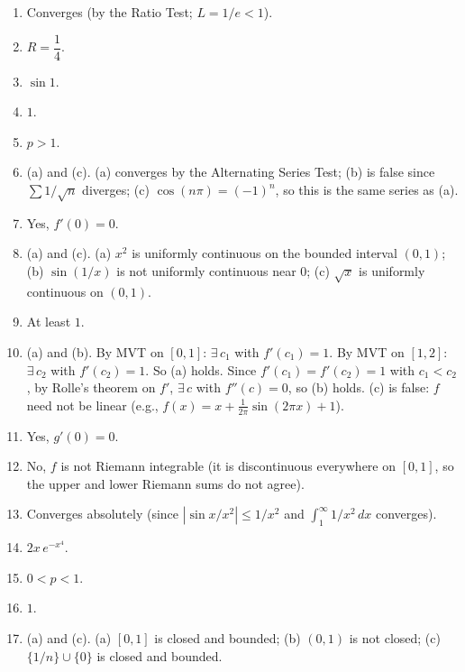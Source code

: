 \documentclass[11pt]{article}
\begin{document}
\begin{enumerate}
\item Converges (by the Ratio Test; $L = 1/e < 1$).

\item $R = \dfrac{1}{4}$.

\item $\sin 1$.

\item $1$.

\item $p > 1$.

\item (a) and (c). \quad (a) converges by the Alternating Series Test; (b) is false since $\sum 1/\sqrt{n}$ diverges; (c) $\cos(n\pi) = (-1)^n$, so this is the same series as (a).

\item Yes, $f'(0) = 0$.

\item (a) and (c). \quad (a) $x^2$ is uniformly continuous on the bounded interval $(0,1)$; (b) $\sin(1/x)$ is not uniformly continuous near $0$; (c) $\sqrt{x}$ is uniformly continuous on $(0,1)$.

\item At least $1$.

\item (a) and (b). \quad By MVT on $[0,1]$: $\exists\,c_1$ with $f'(c_1)=1$. By MVT on $[1,2]$: $\exists\,c_2$ with $f'(c_2)=1$. So (a) holds. Since $f'(c_1)=f'(c_2)=1$ with $c_1<c_2$, by Rolle's theorem on $f'$, $\exists\,c$ with $f''(c)=0$, so (b) holds. (c) is false: $f$ need not be linear (e.g., $f(x)=x+\frac{1}{2\pi}\sin(2\pi x)+1$).

\item Yes, $g'(0) = 0$.

\item No, $f$ is not Riemann integrable (it is discontinuous everywhere on $[0,1]$, so the upper and lower Riemann sums do not agree).

\item Converges absolutely (since $|\sin x / x^2| \le 1/x^2$ and $\int_1^\infty 1/x^2\,dx$ converges).

\item $2x\, e^{-x^4}$.

\item $0 < p < 1$.

\item $1$.

\item (a) and (c). \quad (a) $[0,1]$ is closed and bounded; (b) $(0,1)$ is not closed; (c) $\{1/n\}\cup\{0\}$ is closed and bounded.


\end{enumerate}
\end{document}
